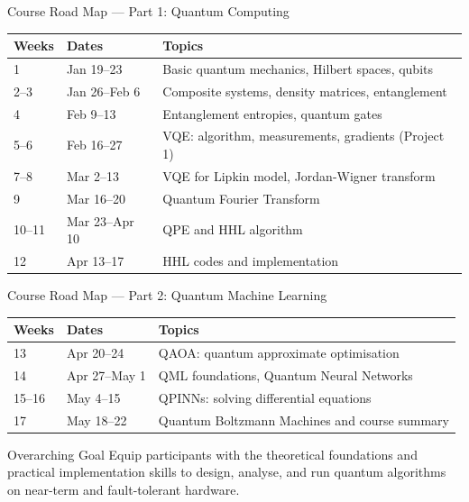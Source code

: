 \documentclass[aspectratio=169,10pt]{beamer}
\begin{document}
\begin{frame}{Course Road Map --- Part 1: Quantum Computing}
  \begin{center}
  \small
  \renewcommand{\arraystretch}{1.28}
  \begin{tabular}{@{}llp{8.0cm}@{}}
    \toprule
    \textbf{Weeks} & \textbf{Dates} & \textbf{Topics} \\
    \midrule
    1     & Jan 19--23     & Basic quantum mechanics, Hilbert spaces, qubits \\
    2--3  & Jan 26--Feb 6  & Composite systems, density matrices, entanglement \\
    4     & Feb 9--13      & Entanglement entropies, quantum gates \\
    5--6  & Feb 16--27     & VQE: algorithm, measurements, gradients (Project 1) \\
    7--8  & Mar 2--13      & VQE for Lipkin model, Jordan-Wigner transform \\
    9     & Mar 16--20     & Quantum Fourier Transform \\
    10--11& Mar 23--Apr 10 & QPE and HHL algorithm \\
    12    & Apr 13--17     & HHL codes and implementation \\
    \bottomrule
  \end{tabular}
  \end{center}
\end{frame}

\begin{frame}{Course Road Map --- Part 2: Quantum Machine Learning}
  \begin{center}
  \small
  \renewcommand{\arraystretch}{1.28}
  \begin{tabular}{@{}llp{8.0cm}@{}}
    \toprule
    \textbf{Weeks} & \textbf{Dates} & \textbf{Topics} \\
    \midrule
    13    & Apr 20--24     & QAOA: quantum approximate optimisation \\
    14    & Apr 27--May 1  & QML foundations, Quantum Neural Networks \\
    15--16& May 4--15      & QPINNs: solving differential equations \\
    17    & May 18--22     & Quantum Boltzmann Machines and course summary \\
    \bottomrule
  \end{tabular}
  \end{center}
  \vspace{6pt}
  \begin{alertblock}{Overarching Goal}
    Equip participants with the theoretical foundations and practical
    implementation skills to design, analyse, and run quantum algorithms
    on near-term and fault-tolerant hardware.
  \end{alertblock}
\end{frame}
\end{document}
